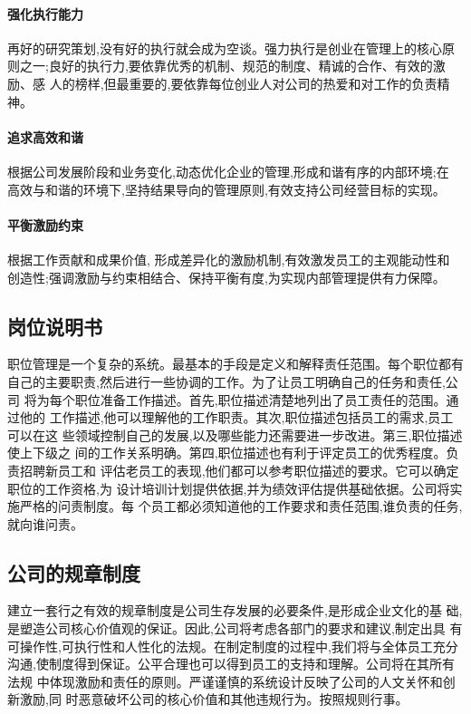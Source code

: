 \paragraph{强化执行能力}
再好的研究策划,没有好的执行就会成为空谈。强力执行是创业在管理上的核心原
则之一;良好的执行力,要依靠优秀的机制、规范的制度、精诚的合作、有效的激励、感
人的榜样,但最重要的,要依靠每位创业人对公司的热爱和对工作的负责精神。

\paragraph{追求高效和谐}
根据公司发展阶段和业务变化,动态优化企业的管理,形成和谐有序的内部环境;在
高效与和谐的环境下,坚持结果导向的管理原则,有效支持公司经营目标的实现。

\paragraph{平衡激励约束}
根据工作贡献和成果价值, 形成差异化的激励机制,有效激发员工的主观能动性和
创造性;强调激励与约束相结合、保持平衡有度,为实现内部管理提供有力保障。

\subsection{岗位说明书}
职位管理是一个复杂的系统。最基本的手段是定义和解释责任范围。每个职位都有
自己的主要职责,然后进行一些协调的工作。为了让员工明确自己的任务和责任,公司
将为每个职位准备工作描述。首先,职位描述清楚地列出了员工责任的范围。通过他的
工作描述,他可以理解他的工作职责。其次,职位描述包括员工的需求,员工可以在这
些领域控制自己的发展,以及哪些能力还需要进一步改进。第三,职位描述使上下级之
间的工作关系明确。第四,职位描述也有利于评定员工的优秀程度。负责招聘新员工和
评估老员工的表现,他们都可以参考职位描述的要求。它可以确定职位的工作资格,为
设计培训计划提供依据,并为绩效评估提供基础依据。公司将实施严格的问责制度。每
个员工都必须知道他的工作要求和责任范围,谁负责的任务,就向谁问责。

\subsection{公司的规章制度}
建立一套行之有效的规章制度是公司生存发展的必要条件,是形成企业文化的基
础,是塑造公司核心价值观的保证。因此,公司将考虑各部门的要求和建议,制定出具
有可操作性,可执行性和人性化的法规。在制定制度的过程中,我们将与全体员工充分
沟通,使制度得到保证。公平合理也可以得到员工的支持和理解。公司将在其所有法规
中体现激励和责任的原则。严谨谨慎的系统设计反映了公司的人文关怀和创新激励,同
时恶意破坏公司的核心价值和其他违规行为。按照规则行事。

